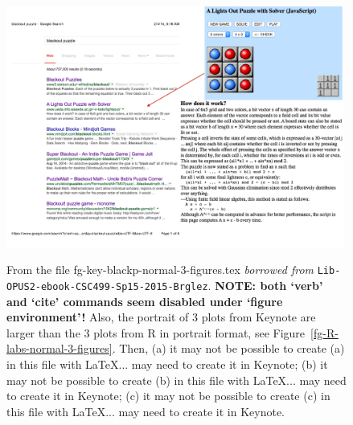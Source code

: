 \begin{figure}[t!]
\vspace*{1ex}%
\\
\includegraphics[width=0.99\textwidth]{fg-key-blackp-descr-a}
\vspace*{1ex}%
%
\caption[From the file fg-key-blackp-normal-3-figures.tex]
{From the file fg-key-blackp-normal-3-figures.tex {\em borrowed from} {\tt Lib-OPUS2-ebook-CSC499-Sp15-2015-Brglez}.
{\bf NOTE: both `verb' and `cite' commands seem disabled under `figure environment'!}
Also, the portrait of 3 plots from Keynote are larger than the 3 plots from R in portrait format,
see Figure~\ref{fg-R-labs-normal-3-figures}.
Then,
(a) 
it may not be possible to create (a) in this file with \LaTeX ... may need to create it in Keynote;
%
(b)
it may not be possible to create (b) in this file with \LaTeX ... may need to create it in Keynote;
%
(c)
it may not be possible to create (c) in this file with \LaTeX ... may need to create it in Keynote.
}
\label{fg-key-blackp-normal-3-figures}
\end{figure}



